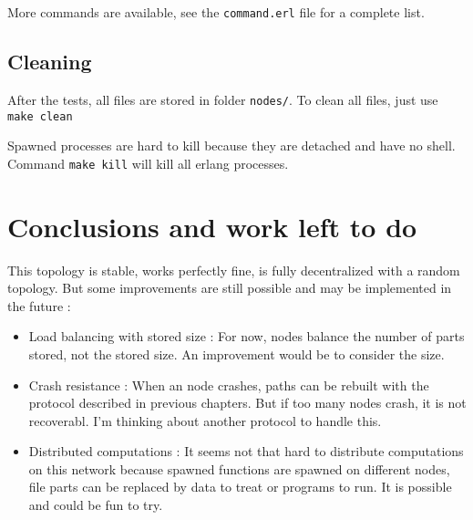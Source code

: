\documentclass[a4paper,10pt]{report}
\begin{document}
More commands are available, see the \texttt{command.erl} file for a 
complete list. 

\section{Cleaning}
After the tests, all files are stored in folder \texttt{nodes/}. 
To clean all files, just use \texttt{make clean}

Spawned processes are hard to kill because they are detached and have
no shell. Command \texttt{make kill} will kill all erlang processes.

\chapter{Conclusions and work left to do}
This topology is stable, works perfectly fine, is fully decentralized
with a random topology. But some improvements are still possible and
may be implemented in the future :

\begin{itemize}
\item Load balancing with stored size : For now, nodes balance the number
of parts stored, not the stored size. An improvement would be to consider
the size.
\item Crash resistance : When an node crashes, paths can be rebuilt with
the protocol described in previous chapters. But if too many nodes crash,
it is not recoverabl. I'm thinking about another protocol to handle this.
\item Distributed computations : It seems not that hard to distribute
computations on this network because spawned functions are spawned on 
different nodes, file parts can be replaced by data to treat or programs
to run. It is possible and could be fun to try.
\end{itemize}
\end{document}
